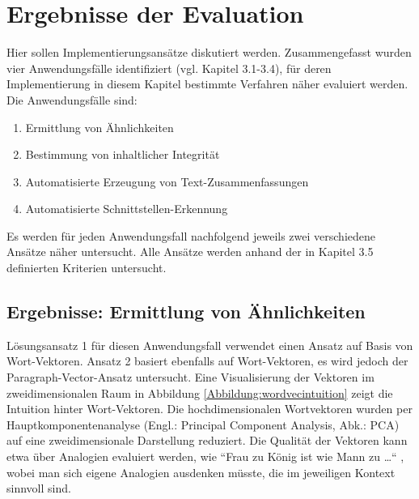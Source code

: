 \chapter{Ergebnisse der Evaluation}
\label{chap4}

Hier sollen Implementierungsansätze diskutiert werden.
Zusammengefasst wurden vier Anwendungsfälle identifiziert (vgl. Kapitel 3.1-3.4), für deren Implementierung in diesem Kapitel bestimmte Verfahren näher evaluiert werden. Die Anwendungsfälle sind:

\begin{enumerate}
  \item Ermittlung von Ähnlichkeiten
  \item Bestimmung von inhaltlicher Integrität
  \item Automatisierte Erzeugung von Text-Zusammenfassungen
  \item Automatisierte Schnittstellen-Erkennung
\end{enumerate}

Es werden für jeden Anwendungsfall nachfolgend jeweils zwei verschiedene Ansätze näher untersucht. Alle Ansätze werden anhand der in Kapitel 3.5 definierten Kriterien untersucht.

\section{Ergebnisse: Ermittlung von Ähnlichkeiten}

Lösungsansatz 1 für diesen Anwendungsfall verwendet einen Ansatz auf Basis von Wort-Vektoren. Ansatz 2 basiert ebenfalls auf Wort-Vektoren, es wird jedoch der Paragraph-Vector-Ansatz untersucht. Eine Visualisierung der Vektoren im zweidimensionalen Raum in Abbildung \ref{Abbildung:wordvecintuition} zeigt die Intuition hinter Wort-Vektoren. Die hochdimensionalen Wortvektoren wurden per Hauptkomponentenanalyse (Engl.: Principal Component Analysis, Abk.: PCA)  auf eine zweidimensionale Darstellung reduziert. Die Qualität der Vektoren kann etwa über Analogien evaluiert werden, wie ``Frau zu König ist wie Mann zu …`` \cite{rehurek2}, wobei man sich eigene Analogien ausdenken müsste, die im jeweiligen Kontext sinnvoll sind.

